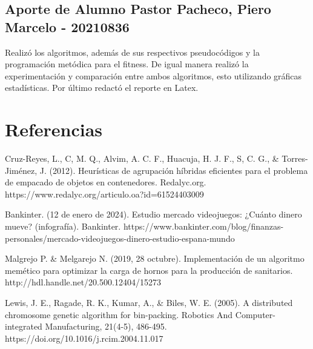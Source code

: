 \documentclass{article}
\begin{document}
\subsection{Aporte de Alumno Pastor Pacheco, Piero Marcelo - 20210836}
Realizó los algoritmos, además de sus respectivos pseudocódigos y la programación metódica para el fitness.\newline
De igual manera realizó la experimentación y comparación entre ambos algoritmos, esto utilizando gráficas estadísticas.\newline
Por último redactó el reporte en Latex.

\section{Referencias}

Cruz-Reyes, L., C, M. Q., Alvim, A. C. F., Huacuja, H. J. F., S, C. G., & Torres-Jiménez, J. (2012). Heurísticas de agrupación híbridas eficientes para el problema de empacado de objetos en contenedores. Redalyc.org. https://www.redalyc.org/articulo.oa?id=61524403009\newline

Bankinter. (12 de enero de 2024). Estudio mercado videojuegos: ¿Cuánto dinero mueve? (infografía). Bankinter. https://www.bankinter.com/blog/finanzas-personales/mercado-videojuegos-dinero-estudio-espana-mundo\newline

Malgrejo P. & Melgarejo N. (2019, 28 octubre). Implementación de un algoritmo memético para optimizar la carga de hornos para la producción de sanitarios. http://hdl.handle.net/20.500.12404/15273\newline

Lewis, J. E., Ragade, R. K., Kumar, A., & Biles, W. E. (2005). A distributed chromosome genetic algorithm for bin-packing. Robotics And Computer-integrated Manufacturing, 21(4-5), 486-495. https://doi.org/10.1016/j.rcim.2004.11.017
\end{document}
